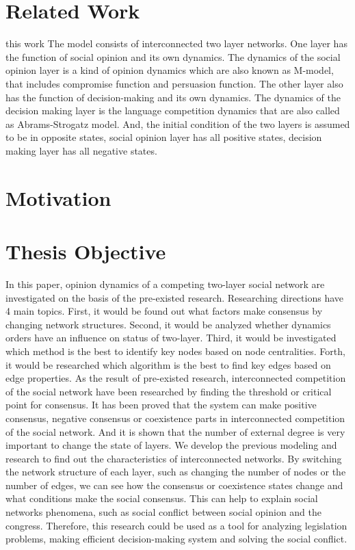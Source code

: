 \section{Related Work}
this work
The model consists of interconnected two layer networks. One layer has the function of social opinion and its own dynamics. The dynamics of the social opinion layer is a kind of opinion dynamics which are also known as M-model\cite{rocca2014}, that includes compromise function and persuasion function. The other layer also has the function of decision-making and its own dynamics. The dynamics of the decision making layer is the language competition dynamics that are also called as Abrams-Strogatz model\cite{abrams2003, vazquez2010}. And, the initial condition of the two layers is assumed to be in opposite states, social opinion layer has all positive states, decision making layer has all negative states.




\section{Motivation}




\section{Thesis Objective}
In this paper, opinion dynamics of a competing two-layer social network are investigated on the basis of the pre-existed research\cite{alvarez2016, gomez2015, diep2017, rocca2014}.
Researching directions have 4 main topics. First, it would be found out what factors make consensus by changing network structures. Second, it would be analyzed whether dynamics orders have an influence on status of two-layer. Third, it would be investigated which method is the best to identify key nodes based on node centralities. Forth, it would be researched which algorithm is the best to find key edges based on edge properties. 
As the result of pre-existed research, interconnected competition of the social network have been researched by finding the threshold or critical point for consensus\cite{alvarez2016, gomez2015, diep2017}. It has been proved that the system can make positive consensus, negative consensus or coexistence parts in interconnected competition of the social network\cite{alvarez2016}. And it is shown that the number of external degree is very important to change the state of layers\cite{gomez2015}. We develop the previous modeling and research to find out the characteristics of interconnected networks. By switching the network structure of each layer, such as changing the number of nodes or the number of edges, we can see how the consensus or coexistence states change and what conditions make the social consensus. This can help to explain social networks phenomena, such as social conflict between social opinion and the congress. Therefore, this research could be used as a tool for analyzing legislation problems, making efficient decision-making system and solving the social conflict. 

